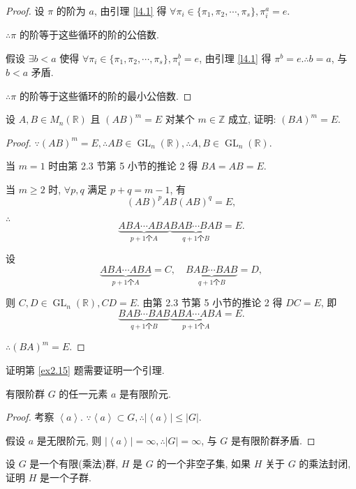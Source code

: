 \documentclass{ctexart}
\begin{document}
\begin{proof}
    设 $\pi$ 的阶为 $a$, 由引理 \ref{l4.1} 得 $\forall\pi_i\in\{\pi_1,\pi_2,\cdots,\pi_s\},\pi_i^a=e$.

    $\therefore\pi$ 的阶等于这些循环的阶的公倍数.

    假设 $\exists b<a$ 使得 $\forall\pi_i\in\{\pi_1,\pi_2,\cdots,\pi_s\},\pi_i^b=e$, 由引理 \ref{l4.1} 得 $\pi^b=e.\therefore b=a$, 与 $b<a$ 矛盾.

    $\therefore\pi$ 的阶等于这些循环的阶的最小公倍数.
\end{proof}
\begin{exercise}[2.14]
    设 $A,B\in M_n(\mathbb{R})$ 且 $(AB)^m=E$ 对某个 $m\in\mathbb{Z}$ 成立, 证明: $(BA)^m=E$.
\end{exercise}
\begin{proof}
    $\because(AB)^m=E,\therefore AB\in\operatorname{GL}_n(\mathbb{R}),\therefore A,B\in\operatorname{GL}_n(\mathbb{R})$.

    当 $m=1$ 时由第 2.3 节第 5 小节的推论 2 得 $BA=AB=E$.

    当 $m\geq2$ 时, $\forall p,q$ 满足 $p+q=m-1$, 有
    \[(AB)^pAB(AB)^q=E,\]

    $\therefore$
    \[\underbrace{ABA\cdots ABA}_{p+1\text{个}A}\underbrace{BAB\cdots BAB}_{q+1\text{个}B}=E.\]

    设
    \[\underbrace{ABA\cdots ABA}_{p+1\text{个}A}=C,\quad\underbrace{BAB\cdots BAB}_{q+1\text{个}B}=D,\]

    则 $C,D\in\operatorname{GL}_n(\mathbb{R}),CD=E$. 由第 2.3 节第 5 小节的推论 2 得 $DC=E$, 即
    \[\underbrace{BAB\cdots BAB}_{q+1\text{个}B}\underbrace{ABA\cdots ABA}_{p+1\text{个}A}=E.\]

    $\therefore(BA)^m=E$.
\end{proof}
证明第 \ref{ex2.15} 题需要证明一个引理.
\begin{lemma}\label{l4.2}
    有限阶群 $G$ 的任一元素 $a$ 是有限阶元.
\end{lemma}
\begin{proof}
    考察 $\left<a\right>$. $\because\left<a\right>\subset G,\therefore|\left<a\right>|\leq|G|$.

    假设 $a$ 是无限阶元, 则 $|\left<a\right>|=\infty,\therefore|G|=\infty$, 与 $G$ 是有限阶群矛盾.
\end{proof}
\begin{exercise}[2.15]\label{ex2.15}
    设 $G$ 是一个有限(乘法)群, $H$ 是 $G$ 的一个非空子集, 如果 $H$ 关于 $G$ 的乘法封闭, 证明 $H$ 是一个子群.
\end{exercise}
\end{document}

